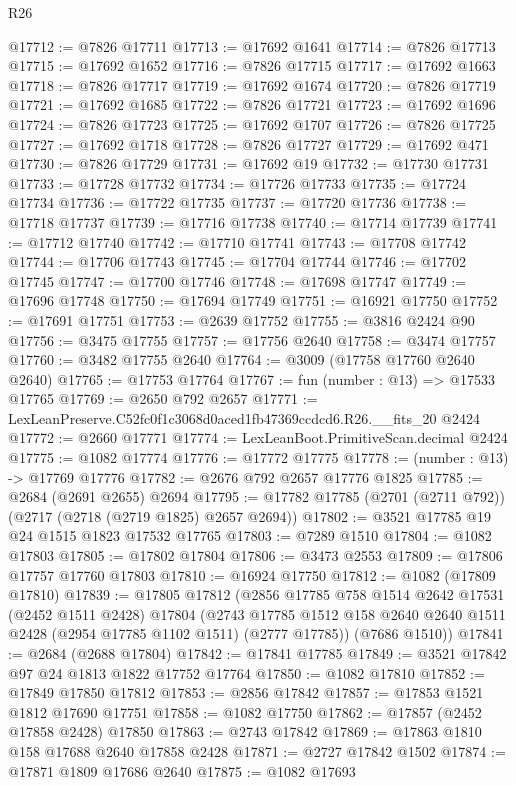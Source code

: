 \begin{lexlean}{R26}
\begin{coremodule}
@17712 := @7826 @17711
@17713 := @17692 @1641
@17714 := @7826 @17713
@17715 := @17692 @1652
@17716 := @7826 @17715
@17717 := @17692 @1663
@17718 := @7826 @17717
@17719 := @17692 @1674
@17720 := @7826 @17719
@17721 := @17692 @1685
@17722 := @7826 @17721
@17723 := @17692 @1696
@17724 := @7826 @17723
@17725 := @17692 @1707
@17726 := @7826 @17725
@17727 := @17692 @1718
@17728 := @7826 @17727
@17729 := @17692 @471
@17730 := @7826 @17729
@17731 := @17692 @19
@17732 := @17730 @17731
@17733 := @17728 @17732
@17734 := @17726 @17733
@17735 := @17724 @17734
@17736 := @17722 @17735
@17737 := @17720 @17736
@17738 := @17718 @17737
@17739 := @17716 @17738
@17740 := @17714 @17739
@17741 := @17712 @17740
@17742 := @17710 @17741
@17743 := @17708 @17742
@17744 := @17706 @17743
@17745 := @17704 @17744
@17746 := @17702 @17745
@17747 := @17700 @17746
@17748 := @17698 @17747
@17749 := @17696 @17748
@17750 := @17694 @17749
@17751 := @16921 @17750
@17752 := @17691 @17751
@17753 := @2639 @17752
@17755 := @3816 @2424 @90
@17756 := @3475 @17755
@17757 := @17756 @2640
@17758 := @3474 @17757
@17760 := @3482 @17755 @2640
@17764 := @3009 (@17758 @17760 @2640 @2640)
@17765 := @17753 @17764
@17767 := fun (number : @13) => @17533 @17765
@17769 := @2650 @792 @2657
@17771 := LexLeanPreserve.C52fc0f1c3068d0aced1fb47369ccdcd6.R26.__fits_20 @2424
@17772 := @2660 @17771
@17774 := LexLeanBoot.PrimitiveScan.decimal @2424
@17775 := @1082 @17774
@17776 := @17772 @17775
@17778 := (number : @13) -> @17769 @17776
@17782 := @2676 @792 @2657 @17776 @1825
@17785 := @2684 (@2691 @2655) @2694
@17795 := @17782 @17785 (@2701 (@2711 @792)) (@2717 (@2718 (@2719 @1825) @2657 @2694))
@17802 := @3521 @17785 @19 @24 @1515 @1823 @17532 @17765
@17803 := @7289 @1510
@17804 := @1082 @17803
@17805 := @17802 @17804
@17806 := @3473 @2553
@17809 := @17806 @17757 @17760 @17803
@17810 := @16924 @17750
@17812 := @1082 (@17809 @17810)
@17839 := @17805
    @17812
    (@2856
      @17785
      @758
      @1514
      @2642
      @17531
      (@2452 @1511 @2428)
      @17804
      (@2743 @17785 @1512 @158 @2640 @2640 @1511 @2428 (@2954 @17785 @1102 @1511) (@2777 @17785))
      (@7686 @1510))
@17841 := @2684 (@2688 @17804)
@17842 := @17841 @17785
@17849 := @3521 @17842 @97 @24 @1813 @1822 @17752 @17764
@17850 := @1082 @17810
@17852 := @17849 @17850 @17812
@17853 := @2856 @17842
@17857 := @17853 @1521 @1812 @17690 @17751
@17858 := @1082 @17750
@17862 := @17857 (@2452 @17858 @2428) @17850
@17863 := @2743 @17842
@17869 := @17863 @1810 @158 @17688 @2640 @17858 @2428
@17871 := @2727 @17842 @1502
@17874 := @17871 @1809 @17686 @2640
@17875 := @1082 @17693

\end{coremodule}
\end{lexlean}
